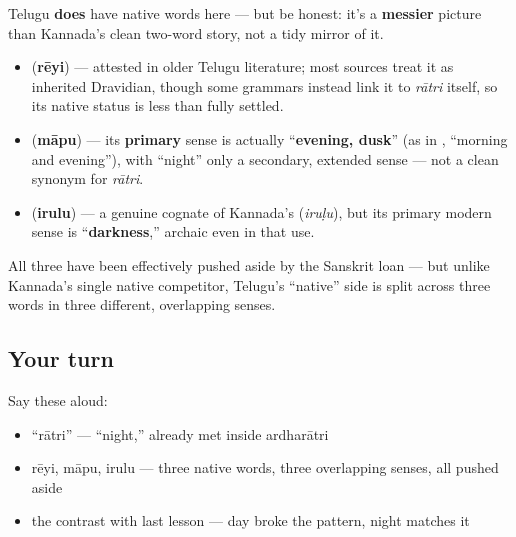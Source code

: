 \begin{cousinweb}
Telugu \textbf{does} have native words here — but be honest: it's a \textbf{messier} picture than Kannada's clean two-word story, not a tidy mirror of it.

\begin{itemize}
\raggedright
  \item \textbf{} (\textbf{rēyi}) — attested in older Telugu literature; most sources treat it as inherited Dravidian, though some grammars instead link it to \emph{rātri} itself, so its native status is less than fully settled.
  \item \textbf{} (\textbf{māpu}) — its \textbf{primary} sense is actually \textquotedblleft{}\textbf{evening, dusk}\textquotedblright{} (as in \textbf{}, \textquotedblleft{}morning and evening\textquotedblright{}), with \textquotedblleft{}night\textquotedblright{} only a secondary, extended sense — not a clean synonym for \emph{rātri}.
  \item \textbf{} (\textbf{irulu}) — a genuine cognate of Kannada's \textbf{} (\emph{iruḷu}), but its primary modern sense is \textquotedblleft{}\textbf{darkness},\textquotedblright{} archaic even in that use.
\end{itemize}

All three have been effectively pushed aside by the Sanskrit loan — but unlike Kannada's single native competitor, Telugu's \textquotedblleft{}native\textquotedblright{} side is split across three words in three different, overlapping senses.
\end{cousinweb}

\subsection*{Your turn}
Say these aloud:

\begin{itemize}
\raggedright
  \item \textquotedblleft{}rātri\textquotedblright{} — \textquotedblleft{}night,\textquotedblright{} already met inside ardharātri
  \item rēyi, māpu, irulu — three native words, three overlapping senses, all pushed aside
  \item the contrast with last lesson — day broke the pattern, night matches it
\end{itemize}

